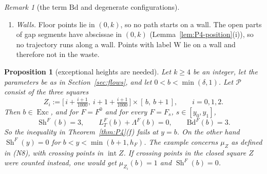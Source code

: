 \documentclass[11pt]{amsart}
\newcommand{\cP}{\mathcal P}
\newcommand{\Sh}{\operatorname{Sh}}
\newcommand{\Exc}{\operatorname{Exc}}
\newcommand{\Lam}{\Lambda}
\newcommand{\Fz}{F^{0}}
\newcommand{\Fs}{F_{s}}
\newtheorem{proposition}[theorem]{Proposition}
\theoremstyle{definition}
\theoremstyle{remark}
\newtheorem{remark}[theorem]{Remark}
\numberwithin{equation}{section}
\begin{document}
\begin{remark}[the term $\mathrm{Bd}$ and degenerate configurations]
\begin{enumerate}[(1)]
\item \emph{Walls.} Floor points lie in $(0,k)$, so no path starts on a wall. The open parts of gap segments have abscissae in $(0,k)$ (Lemma~\ref{lem:P4-position}(i)), so no trajectory runs along a wall. Points with label W lie on a wall and therefore not in the waste.
\end{enumerate}
\end{remark}

\begin{proposition}[exceptional heights are needed]\label{prop:P4-example}
Let $k\ge4$ be an integer, let the parameters be as in Section~\ref{sec:flows}, and let $0<b<\min(\delta,1)$. Let $\cP$ consist of the three squares
\[
Z_i:=\Big[\,i+\tfrac{i+1}{1000},\ i+1+\tfrac{i+1}{1000}\,\Big]\times[\,b,\ b+1\,],\qquad i=0,1,2 .
\]
Then $b\in\Exc$, and for $F=\Fz$ and for every $F=\Fs$, $s\in[y_0,y_1]$,
\[
\Sh^F(b)=3,\qquad L^F_T(b)+\Lam^F(b)=0,\qquad \mathrm{Bd}^F(b)=3 .
\]
So the inequality in Theorem~\ref{thm:P4}(f) fails at $y=b$. On the other hand $\Sh^F(y)=0$ for $b<y<\min(b+1,h_F)$. The example concerns $\mu_Z$ as defined in (N8), with crossing points in $\operatorname{int}Z$. If crossing points in the closed square $Z$ were counted instead, one would get $\mu_{Z_i}(b)=1$ and $\Sh^F(b)=0$.
\end{proposition}
\end{document}
